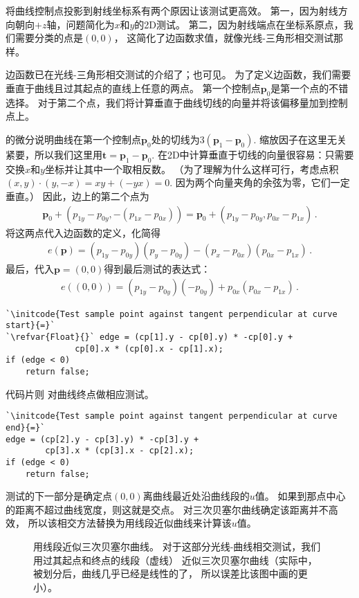 将曲线控制点投影到射线坐标系有两个原因让该测试更高效。
第一，因为射线方向朝向$+z$轴，问题简化为$x$和$y$的2D测试。
第二，因为射线端点在坐标系原点，我们需要分类的点是$(0,0)$，
这简化了边函数求值，就像光线-三角形相交测试那样。

边函数已在光线-三角形相交测试的介绍了；也可见。
为了定义边函数，我们需要垂直于曲线且过其起点的直线上任意的两点。
第一个控制点$\bm p_0$是第一个点的不错选择。
对于第二个点，我们将计算垂直于曲线切线的向量并将该偏移量加到控制点上。

的微分说明曲线在第一个控制点$\bm p_0$处的切线为$3(\bm p_1-\bm p_0)$.
缩放因子在这里无关紧要，所以我们这里用$\bm t=\bm p_1-\bm p_0$.
在2D中计算垂直于切线的向量很容易：只需要交换$x$和$y$坐标并让其中一个取相反数。
（为了理解为什么这样可行，考虑点积$(x,y)\cdot(y,-x)=xy+(-yx)=0$.
因为两个向量夹角的余弦为零，它们一定垂直。）
因此，边上的第二个点为
\begin{align*}
    \bm p_0+(p_{1y}-p_{0y},-(p_{1x}-p_{0x}))=\bm p_0+(p_{1y}-p_{0y},p_{0x}-p_{1x})\, .
\end{align*}
将这两点代入边函数的定义，化简得
\begin{align*}
    e(\bm p)=(p_{1y}-p_{0y})(p_y-p_{0y})-(p_x-p_{0x})(p_{0x}-p_{1x})\, .
\end{align*}
最后，代入$\bm p=(0,0)$得到最后测试的表达式：
\begin{align*}
    e((0,0))=(p_{1y}-p_{0y})(-p_{0y})+p_{0x}(p_{0x}-p_{1x})\, .
\end{align*}
\begin{lstlisting}
`\initcode{Test sample point against tangent perpendicular at curve start}{=}`
`\refvar{Float}{}` edge = (cp[1].y - cp[0].y) * -cp[0].y +
              cp[0].x * (cp[0].x - cp[1].x);
if (edge < 0)
    return false;
\end{lstlisting}

代码片则
对曲线终点做相应测试。
\begin{lstlisting}
`\initcode{Test sample point against tangent perpendicular at curve end}{=}`
edge = (cp[2].y - cp[3].y) * -cp[3].y +
        cp[3].x * (cp[3].x - cp[2].x);
if (edge < 0)
    return false;
\end{lstlisting}

测试的下一部分是确定点$(0,0)$离曲线最近处沿曲线段的$u$值。
如果到那点中心的距离不超过曲线宽度，则这就是交点。
对三次贝塞尔曲线确定该距离并不高效，
所以该相交方法替换为用线段近似曲线来计算该$u$值。
\begin{figure}[htbp]
    \centering
    \caption{用线段近似三次贝塞尔曲线。
        对于这部分光线-曲线相交测试，我们用过其起点和终点的线段（虚线）
        近似三次贝塞尔曲线（实际中，被划分后，曲线几乎已经是线性的了，
        所以误差比该图中画的更小）。}
    \label{fig:3.22}
\end{figure}

